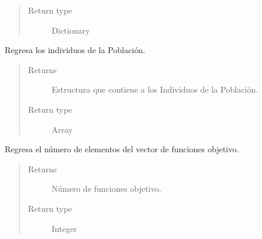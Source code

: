 \documentclass[letterpaper,10pt,english]{sphinxmanual}
\begin{document}
\begin{fulllineitems}
\begin{fulllineitems}
\begin{quote}
\begin{description}
\item[{Return type}] \leavevmode
Dictionary

\end{description}\end{quote}

\end{fulllineitems}


\begin{fulllineitems}
\label{Model/Community/Population/Population:Model.Community.Population.Population.Population.get_individuals}
Regresa los individuos de la Población.
\begin{quote}\begin{description}
\item[{Returns}] \leavevmode
Estructura que contiene a los Individuos de la Población.

\item[{Return type}] \leavevmode
Array

\end{description}\end{quote}

\end{fulllineitems}


\begin{fulllineitems}
\label{Model/Community/Population/Population:Model.Community.Population.Population.Population.get_length_vector_functions}
Regresa el número de elementos del vector de funciones objetivo.
\begin{quote}\begin{description}
\item[{Returns}] \leavevmode
Número de funciones objetivo.

\item[{Return type}] \leavevmode
Integer

\end{description}\end{quote}

\end{fulllineitems}



\end{fulllineitems}
\end{document}
